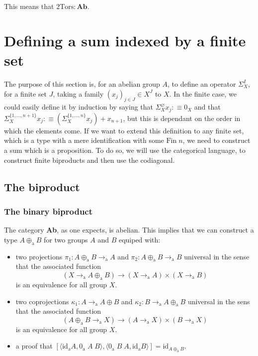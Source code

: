 \documentclass{article}
\newcommand{\toa}[0]{\to_\mathrm a}
\newcommand{\twotors}[0]{2\mathrm{Tors}}
\newcommand{\idd}[0]{\mathrm{id}}
\newcommand{\oplusa}[0]{\oplus_\mathrm a}
\begin{document}
This means that $\twotors : \textbf{Ab}$.

\section{Defining a sum indexed by a finite set}

The purpose of this section is, for an abelian group $A$, to define an operator $\Sigma^I_X$, for a finite set
$J$, taking a family $(x_j)_{j\in J}\in X^J$ to $X$. In the finite case, we could easily define it by
induction by saying that $\Sigma_X^\varnothing x_j :\equiv 0_X$ and that 
$\Sigma_X^{\{1,\ldots,n+1\}} x_j :\equiv \left(\Sigma_X^{\{1,\ldots,n\}} x_j\right) + x_{n+1}$, but this is
dependant on the order in which the elements come. If we want to extend this definition to any finite set,
which is a type with a mere identification with some $\mathrm{Fin}\;n$, we need to construct a sum which is a
proposition. To do so, we will use the categorical language, to construct finite biproducts and then use the
codiagonal.

\subsection{The biproduct}

\subsubsection{The binary biproduct}

The category \textbf{Ab}, as one expects, is abelian. This implies that we can construct a type $A \oplusa B$
for two groups $A$ and $B$ equiped with:
\begin{itemize}
    \item two projections $\pi_1 : A\oplusa B \toa A$ and $\pi_2 : A \oplusa B \toa B$ universal in the sense
    that the associated function $$(X\toa A\oplusa B) \to (X\toa A)\times (X\toa B)$$ is an equivalence for
    all group $X$.
    \item two coprojections $\kappa_1 : A \toa A\oplus B$ and $\kappa_2 : B\toa A \oplusa B$ universal in the
    sens that the associated function $$(A\oplusa B \toa X) \to (A\toa X) \times (B\toa X)$$ is an equivalence
    for all group $X$.
    \item a proof that $[\langle \idd_\mathrm a A, 0_\mathrm a\;A\;B\rangle , \langle 0_\mathrm a\;B\;A,\idd
    _\mathrm a B\rangle] = \idd_{A\oplusa B}$.
\end{itemize}
\end{document}
